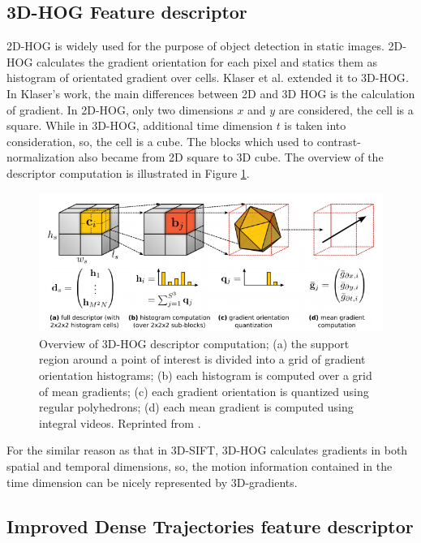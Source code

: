 \subsection{3D-HOG Feature descriptor}
\label{2_2_2}
2D-HOG is widely used for the purpose of object detection in static images. 2D-HOG calculates the gradient orientation for each pixel and statics them as histogram of orientated gradient over cells. Klaser et al. extended it to 3D-HOG\cite{alex2008}. In Klaser's work, the main differences between 2D and 3D HOG is the calculation of gradient. In 2D-HOG, only two dimensions \(x\) and \(y\) are considered, the cell is a square. While in 3D-HOG, additional time dimension \(t\) is taken into consideration, so, the cell is a cube. The blocks which used to contrast-normalization also became from 2D square to 3D cube. The overview of the descriptor computation is illustrated in Figure \ref{fig:3DHOG}.
\begin{figure}
	\includegraphics[width=\linewidth]{figs/3D_HOG.png}
	\caption{ Overview of 3D-HOG descriptor computation; (a) the support region around a point
		of interest is divided into a grid of gradient orientation histograms; (b) each histogram is
		computed over a grid of mean gradients; (c) each gradient orientation is quantized using
		regular polyhedrons; (d) each mean gradient is computed using integral videos. Reprinted from \cite{alex2008}.}
	\label{fig:3DHOG}
\end{figure}
\par 

For the similar reason as that in 3D-SIFT, 3D-HOG calculates gradients in both spatial and temporal dimensions, so, the motion information contained in the time dimension can be nicely represented by 3D-gradients. 

\subsection{Improved Dense Trajectories feature descriptor}
\label{2_2_3}

